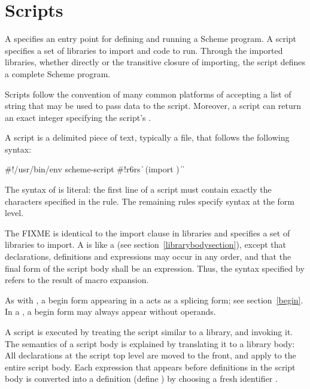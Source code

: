 \chapter{Scripts}
\label{scriptchapter}

A  specifies an entry point for defining and running
a Scheme program.  A script specifies a set of libraries to import and
code to run.  Through the imported libraries, whether directly or the
transitive closure of importing, the script defines a complete Scheme
program.

Scripts follow the convention of many common platforms of accepting a
list of string  that may be used to
pass data to the script.  Moreover, a script can return an exact
integer specifying the script's .

A script is a delimited piece of text, typically a file, that follows
the following syntax:

\begin{grammar}
 \: \#!/usr/bin/env scheme-script
  \> 
  \> 
 \: \#!r6rs  
  \> \|  
 \: (import )
 \:  
 \: 
\> \| 
\> \| 
\end{grammar}

The syntax of  is literal: the first line of a
script must contain exactly the characters specified in the rule.  The
remaining rules specify syntax at the form level.  

The  FIXME is identical to the import clause in
libraries and specifies a set of libraries to import.  A  is like a  (see
section~\ref{librarybodysection}), except that declarations,
definitions and expressions may occur in any order, and that the final
form of the script body shall be an expression.  Thus, the syntax
specified by  refers to the result of macro
expansion.

As with , a {\cf begin} form appearing in a
 acts as a splicing form; see section~\ref{begin}.
In a , a {\cf begin} form may always appear without
operands.

A script is executed by treating the script similar to a library, and
invoking it.  The semantics of a script body is explained by
translating it to a library body: All declarations at the script top
level are moved to the front, and apply to the entire script body.
Each expression  that appears before definitions in
the script body is converted into a definition {\cf (define 
  )} by choosing a fresh identifier .

